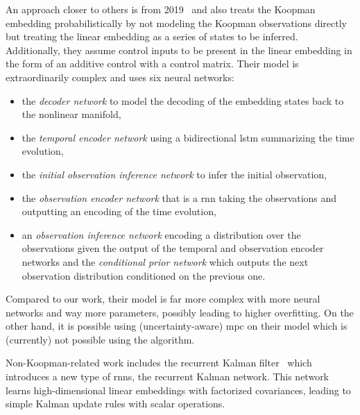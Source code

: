An approach closer to others is from 2019~\cite{mortonDeepVariationalKoopman2019a} and also treats the Koopman embedding probabilistically by not modeling the Koopman observations directly but treating the linear embedding as a series of states to be inferred. Additionally, they assume control inputs to be present in the linear embedding in the form of an additive control with a control matrix. Their model is extraordinarily complex and uses six neural networks:
\begin{itemize}
	\item the \emph{decoder network} to model the decoding of the embedding states back to the nonlinear manifold,
	\item the \emph{temporal encoder network} using a bidirectional \ac{lstm} summarizing the time evolution,
	\item the \emph{initial observation inference network} to infer the initial observation,
	\item the \emph{observation encoder network} that is a \ac{rnn} taking the observations and outputting an encoding of the time evolution,
	\item an \emph{observation inference network} encoding a distribution over the observations given the output of the temporal and observation encoder networks and
	the \emph{conditional prior network} which outputs the next observation distribution conditioned on the previous one.
\end{itemize}
Compared to our work, their model is far more complex with more neural networks and way more parameters, possibly leading to higher overfitting. On the other hand, it is possible using (uncertainty-aware) \ac{mpc} on their model which is (currently) not possible using the \algname algorithm.

Non-Koopman-related work includes the recurrent Kalman filter~\cite{beckerRecurrentKalmanNetworks2019a} which introduces a new type of \acp{rnn}, the recurrent Kalman network. This network learns high-dimensional linear embeddings with factorized covariances, leading to simple Kalman update rules with scalar operations.

